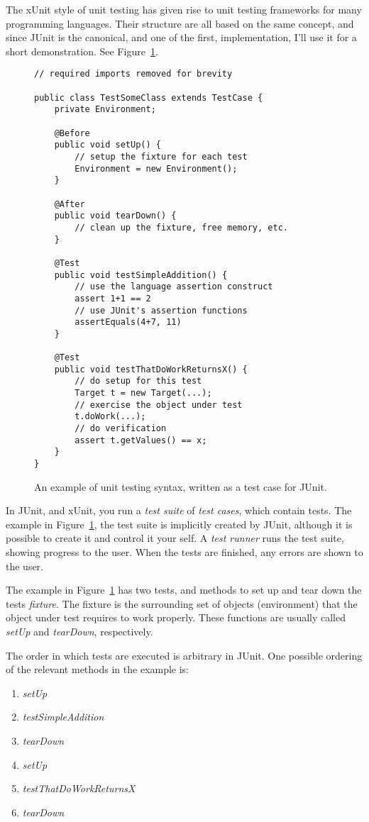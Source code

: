 \documentclass[a4paper,11pt]{kth-mag}
\begin{document}
The xUnit style of unit testing \cite{fowlerxunit} has given rise to unit
testing frameworks for many programming languages. Their structure are all
based on the same concept, and since JUnit is the canonical, and one of the
first, implementation, I'll use it for a short demonstration. See
Figure~\ref{figure-junit}.

\begin{figure}[h!]
\lstset{language=Java}
\begin{lstlisting}
// required imports removed for brevity

public class TestSomeClass extends TestCase {
	private Environment;

	@Before
	public void setUp() {
		// setup the fixture for each test
		Environment = new Environment();
	}

	@After
	public void tearDown() {
		// clean up the fixture, free memory, etc.
	}

	@Test
	public void testSimpleAddition() {
		// use the language assertion construct
		assert 1+1 == 2
		// use JUnit's assertion functions
		assertEquals(4+7, 11)
	}

	@Test
	public void testThatDoWorkReturnsX() {
		// do setup for this test
		Target t = new Target(...);
		// exercise the object under test
		t.doWork(...);
		// do verification
		assert t.getValues() == x;
	}
}
\end{lstlisting}
\caption{An example of unit testing syntax, written as a test case for JUnit.}
\label{figure-junit}
\end{figure}

In JUnit, and xUnit, you run a \textit{test suite} of \textit{test cases},
which contain tests. The example in Figure~\ref{figure-junit}, the test suite
is implicitly created by JUnit, although it is possible to create it and
control it your self. A \textit{test runner} runs the test suite, showing
progress to the user.  When the tests are finished, any errors are shown to the
user.

The example in Figure~\ref{figure-junit} has two tests, and methods to set up
and tear down the tests \textit{fixture}. The fixture is the surrounding set of
objects (environment) that the object under test requires to work properly.
These functions are usually called \textit{setUp} and \textit{tearDown},
respectively.

The order in which tests are executed is arbitrary in JUnit. One possible
ordering of the relevant methods in the example is:

\begin{enumerate}
	\item \textit{setUp}
	\item \textit{testSimpleAddition}
	\item \textit{tearDown}

	\item \textit{setUp}
	\item \textit{testThatDoWorkReturnsX}
	\item \textit{tearDown}
\end{enumerate}
\end{document}
